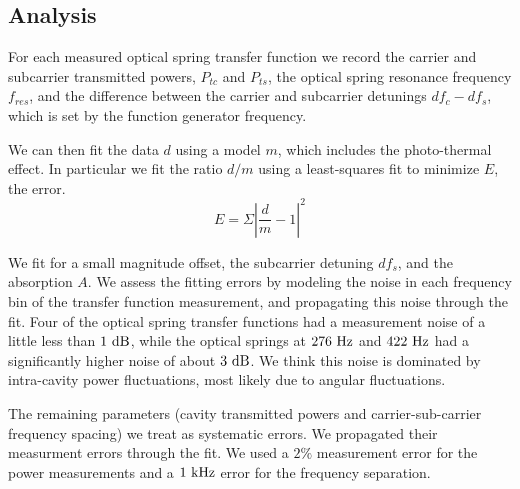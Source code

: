 \subsection{Analysis}

For each measured optical spring transfer function we record the carrier and subcarrier transmitted powers, $P_{tc}$ and $P_{ts}$, the optical spring resonance frequency $f_{res}$, and the difference between the carrier and subcarrier detunings $df_c-df_s$, which is set by the function generator frequency.   


We can then fit the data $d$ using a model $m$, which includes the photo-thermal effect. In particular we fit the ratio $d/m$ using a least-squares fit to minimize $E$, the error.
\begin{equation}
E=\Sigma \left|\frac{d}{m}-1\right|^2 
\end{equation}

We fit for a small magnitude offset, the subcarrier detuning $df_s$, and the absorption $A$. We assess the fitting errors by modeling the noise in each frequency bin of the transfer function measurement, and propagating this noise through the fit. Four of the optical spring transfer functions  had a measurement noise of a little less than $1~{\rm dB}$, while the optical springs at $276~{\rm Hz}$ and $422~{\rm Hz}$ had a significantly higher noise of about $3~{\rm dB}$. We think this noise is dominated by intra-cavity power fluctuations, most likely due to angular fluctuations.

The remaining parameters (cavity transmitted powers and carrier-sub-carrier frequency spacing) we treat as systematic errors. We propagated their measurment errors through the fit. We used a $2\%$ measurement error for the power measurements and  a $1~{\rm kHz}$ error for the frequency separation.






